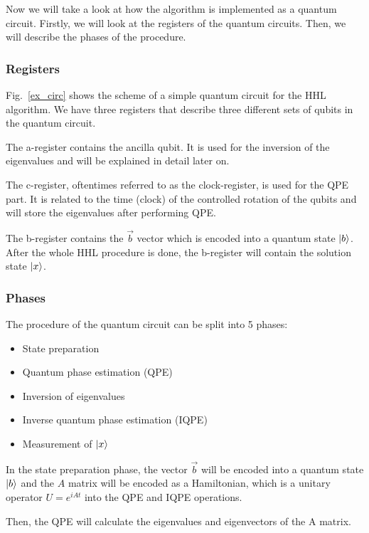 Now we will take a look at how the algorithm is implemented as a quantum circuit. 
Firstly, we will look at the registers of the quantum circuits. 
Then, we will describe the phases of the procedure.

\subsubsection{Registers}
Fig.~\ref{ex_circ} shows the scheme of a simple quantum circuit for the HHL algorithm.
We have three registers that describe three different sets of qubits in the quantum circuit.

The a-register contains the ancilla qubit. 
It is used for the inversion of the eigenvalues and will be explained in detail later on.

The c-register, oftentimes referred to as the clock-register, is used for the QPE part. It is related to the time (clock) of the controlled rotation of the qubits and will store the eigenvalues after performing QPE.

The b-register contains the $\vec{b}$ vector which is encoded into a quantum state $\ket{b}$. 
After the whole HHL procedure is done, the b-register will contain the solution state $\ket{x}$.



\subsubsection{Phases}
The procedure of the quantum circuit can be split into 5 phases:

\begin{itemize}
\item State preparation
\item Quantum phase estimation (QPE)
\item Inversion of eigenvalues
\item Inverse quantum phase estimation (IQPE)
\item Measurement of $\ket x$
\end{itemize}

In the state preparation phase, the vector $\vec{b}$ will be encoded into a quantum state $\ket{b}$ and the $A$ matrix will be encoded as a Hamiltonian, which is a unitary operator
$U=e^{iAt}$ into the QPE and IQPE operations.

Then, the QPE will calculate the eigenvalues and eigenvectors of the A matrix.

